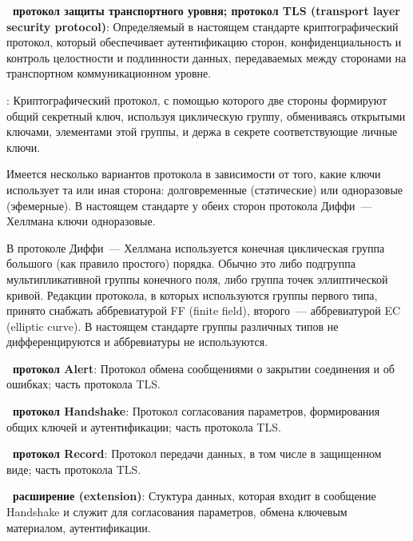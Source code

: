 {\bf \thedefctr~протокол защиты транспортного уровня; протокол TLS 
(transport layer security protocol)}: 
Определяемый в настоящем стандарте криптографический протокол, который
обеспечивает аутентификацию сторон, конфиденциальность и контроль целостности и
подлинности данных, передаваемых между сторонами на транспортном
коммуникационном уровне.

:
Криптографический протокол, с помощью которого две стороны формируют 
общий секретный ключ, используя циклическую группу, обмениваясь открытыми 
ключами, элементами этой группы, и держа в секрете соответствующие личные 
ключи. 

\begin{note}
Имеется несколько вариантов протокола в зависимости от того, какие ключи 
использует та или иная сторона: долговременные (статические) или 
одноразовые (эфемерные). В настоящем стандарте у обеих сторон протокола 
Диффи~--- Хеллмана ключи одноразовые.
\end{note}

\begin{note}
В протоколе Диффи~--- Хеллмана используется конечная циклическая группа большого
(как правило простого) порядка. Обычно это либо подгруппа мультипликативной
группы конечного поля, либо группа точек эллиптической кривой.
%
Редакции протокола, в которых используются группы первого типа, принято снабжать
аббревиатурой FF (finite field), второго~--- аббревиатурой EC (elliptic curve).
%
В настоящем стандарте группы различных типов не дифференцируются и аббревиатуры 
не используются.
\end{note}

{\bf \thedefctr~протокол Alert}:
Протокол обмена сообщениями о закрытии соединения и об ошибках;
часть протокола TLS.

{\bf \thedefctr~протокол Handshake}:
Протокол согласования параметров, формирования общих ключей и аутентификации; 
часть протокола TLS. 


{\bf \thedefctr~протокол Record}:
Протокол передачи данных, в том числе в защищенном виде; 
часть протокола TLS. 

{\bf \thedefctr~расширение (extension)}:
Стуктура данных, которая входит в сообщение Handshake и служит для 
согласования параметров, обмена ключевым материалом, аутентификации.

